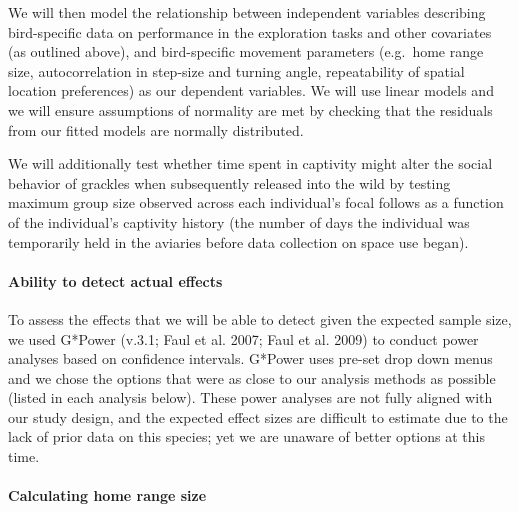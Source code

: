 \documentclass[
]{article}
\begin{document}
We will then model the relationship between independent variables
describing bird-specific data on performance in the exploration tasks
and other covariates (as outlined above), and bird-specific movement
parameters (e.g.~home range size, autocorrelation in step-size and
turning angle, repeatability of spatial location preferences) as our
dependent variables. We will use linear models and we will ensure
assumptions of normality are met by checking that the residuals from our
fitted models are normally distributed.

We will additionally test whether time spent in captivity might alter
the social behavior of grackles when subsequently released into the wild
by testing maximum group size observed across each individual's focal
follows as a function of the individual's captivity history (the number
of days the individual was temporarily held in the aviaries before data
collection on space use began).

\hypertarget{ability-to-detect-actual-effects}{%
\paragraph{Ability to detect actual
effects}\label{ability-to-detect-actual-effects}}

To assess the effects that we will be able to detect given the expected
sample size, we used G*Power (v.3.1; Faul et al. 2007; Faul et al. 2009)
to conduct power analyses based on confidence intervals. G*Power uses
pre-set drop down menus and we chose the options that were as close to
our analysis methods as possible (listed in each analysis below). These
power analyses are not fully aligned with our study design, and the
expected effect sizes are difficult to estimate due to the lack of prior
data on this species; yet we are unaware of better options at this time.

\hypertarget{calculating-home-range-size}{%
\paragraph{Calculating home range
size}\label{calculating-home-range-size}}
\end{document}
